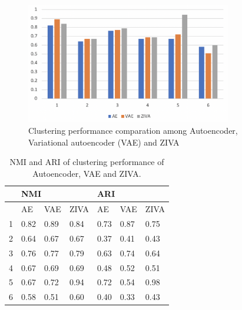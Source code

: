 \begin{figure}[htb!]
    \centering
    \includegraphics[width=0.8\textwidth]{figures/myfigures/3aeclu.png}
    \caption{Clustering performance comparation among Autoencoder, Variational autoencoder (VAE) and ZIVA}
    \label{3aeclu}
\end{figure}

\begin{table}[htb!]
\centering
\caption{NMI and ARI of clustering performance of Autoencoder, VAE and ZIVA.}
\label{t3ae}
\begin{tabular}{lllllll}
\hline
  & \multicolumn{3}{l}{NMI} & \multicolumn{3}{l}{ARI} \\ \hline
  & AE     & VAE    & ZIVA  & AE     & VAE    & ZIVA  \\ \hline
1 & 0.82   & 0.89   & 0.84  & 0.73   & 0.87   & 0.75  \\
2 & 0.64   & 0.67   & 0.67  & 0.37   & 0.41   & 0.43  \\
3 & 0.76   & 0.77   & 0.79  & 0.63   & 0.74   & 0.64  \\
4 & 0.67   & 0.69   & 0.69  & 0.48   & 0.52   & 0.51  \\
5 & 0.67   & 0.72   & 0.94  & 0.72   & 0.54   & 0.98  \\
6 & 0.58   & 0.51   & 0.60  & 0.40   & 0.33   & 0.43  \\ \hline
\end{tabular}
\end{table}

\clearpage

